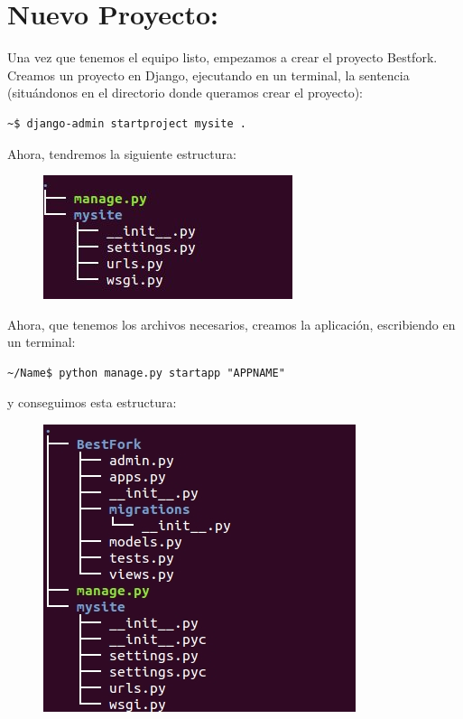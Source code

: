 \documentclass[a4paper, 12pt]{book}
\begin{document}
\section{Nuevo Proyecto: }

Una vez que tenemos el equipo listo, empezamos a crear el proyecto Bestfork.
Creamos un proyecto en Django, ejecutando en un terminal, la sentencia (situándonos en el directorio donde queramos crear el proyecto):\\
\lstset{language=bash, breaklines=true, basicstyle=\footnotesize}
\begin{lstlisting}[frame=single]
~$ django-admin startproject mysite .
\end{lstlisting}

Ahora, tendremos la siguiente estructura:

\begin{figure}[hbtp]
\centering
\includegraphics[scale=0.8]{img/tree.jpg} 
\end{figure}

Ahora, que tenemos los archivos necesarios, creamos la aplicación, escribiendo en un terminal:
\lstset{language=bash, breaklines=true, basicstyle=\footnotesize}
\begin{lstlisting}[frame=single]
~/Name$ python manage.py startapp "APPNAME"
\end{lstlisting}   
y conseguimos esta estructura:

\begin{figure}[H]
\centering
\includegraphics[scale=0.5]{img/treeBig.jpg} 
\end{figure}
\end{document}

